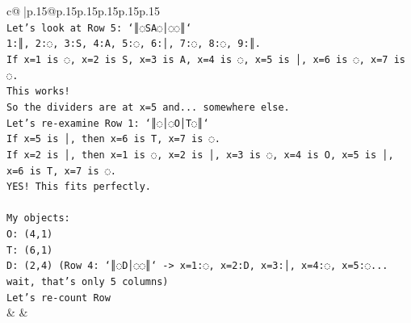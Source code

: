 \documentclass{article}
\begin{document}
{\begin{supertabular}{c@{$\;$}|p{.15\linewidth}@{}p{.15\linewidth}p{.15\linewidth}p{.15\linewidth}p{.15\linewidth}p{.15\linewidth}}
{{{\\ 
\texttt{Let's look at Row 5: `║◌SA◌│◌◌║`} \\
\texttt{1:║, 2:◌, 3:S, 4:A, 5:◌, 6:│, 7:◌, 8:◌, 9:║.} \\
\texttt{If x=1 is ◌, x=2 is S, x=3 is A, x=4 is ◌, x=5 is │, x=6 is ◌, x=7 is ◌.} \\
\texttt{This works!} \\
\texttt{So the dividers are at x=5 and... somewhere else.} \\
\texttt{Let's re{-}examine Row 1: `║◌│◌O│T◌║`} \\
\texttt{If x=5 is │, then x=6 is T, x=7 is ◌.} \\
\texttt{If x=2 is │, then x=1 is ◌, x=2 is │, x=3 is ◌, x=4 is O, x=5 is │, x=6 is T, x=7 is ◌.} \\
\texttt{YES! This fits perfectly.} \\
\\ 
\texttt{My objects:} \\
\texttt{O: (4,1)} \\
\texttt{T: (6,1)} \\
\texttt{D: (2,4) (Row 4: `║◌D│◌◌║` {-}> x=1:◌, x=2:D, x=3:│, x=4:◌, x=5:◌... wait, that's only 5 columns)} \\
\texttt{Let's re{-}count Row} \\
            }
        }
    }
    & & \\ \\


\end{supertabular}}
\end{document}
